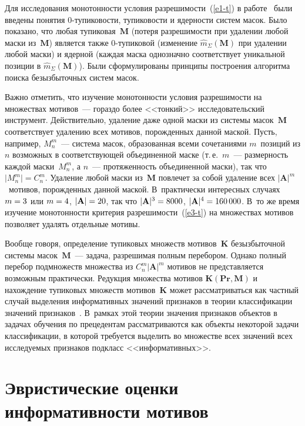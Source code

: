 \begin{multicols}{2}
Для исследования монотонности условия разрешимости~(\ref{e1-t}) в
работе~\cite{3-t} были введены понятия 0-ту\-пи\-ко\-вости, тупиковости и
ядерности сис\-тем масок. Было показано, что любая тупиковая~$\mathbf{M}$ (потеря
разрешимости при удалении любой маски из~$\mathbf{M}$) является также
0-ту\-пи\-ко\-вой (изменение $\hat{m}_\Sigma(\mathbf{M})$ при удалении любой
маски) и ядерной (каж\-дая маска однозначно соответствует уникальной
позиции в $\hat{m}_\Sigma(\mathbf{M})$). Были сформулированы принципы
построения алгоритма поиска безызбыточных систем масок.

Важно отметить, что изучение монотонности условия разрешимости на
множествах мотивов~--- гораздо более <<тонкий>> исследовательский
инструмент. Действительно, удаление даже одной маски из системы
масок~$\mathbf{M}$ соответствует удалению всех мотивов, порожденных данной
маской. Пусть, например, $M_n^m$~--- сис\-те\-ма масок, образованная
всеми сочетаниями $m$~позиций из $n$ возможных в соответствующей
объединенной маске (т.\,е.\ $m$~--- размерность каждой маски~$M_n^m$, а
$n$~--- протяженность объединенной маски), так что $\vert M_n^m\vert
=C_n^m$. Удаление любой маски из~$\mathbf{M}$ повлечет за собой удаление всех
$\vert \mathbf{A}\vert^m$~мотивов, порожденных данной маской. В~практически
интересных случаях $m\hm=3$ или $m\hm=4$, $\vert \mathbf{A}\vert \hm=20$, так что
$\vert \mathbf{A}\vert^3\hm=8000$, $\vert \mathbf{A}\vert^4\hm=160\,000$. В~то же время
изучение монотонности критерия разрешимости~(\ref{e3-t}) на множествах
мотивов позволяет удалять отдельные мотивы.

Вообще говоря, определение тупиковых множеств мотивов~$\mathbf{K}$
безызбыточной системы масок~$\mathbf{M}$~--- задача, разрешимая полным
перебором. Однако полный перебор подмножеств множества из $C_n^m \vert
\mathbf{A}\vert^m$ мотивов не представляется возможным практически. Редукция
множества мотивов $\mathbf{K}(\mathbf{Pr}, \mathbf{M})$ и нахождение тупиковых множеств
мотивов~$\mathbf{K}$ может рассматриваться как частный случай выделения
информативных значений признаков в теории классификации значений
признаков~\cite{7-t, 8-t}. В~рамках этой тео\-рии значения признаков
объектов в задачах обучения по прецедентам рассматриваются как объекты
некоторой задачи классификации, в которой требуется выделить во
множестве всех значений всех исследуемых признаков подкласс
<<информативных>>.

\section{Эвристические оценки информативности мотивов} %


\end{multicols}
